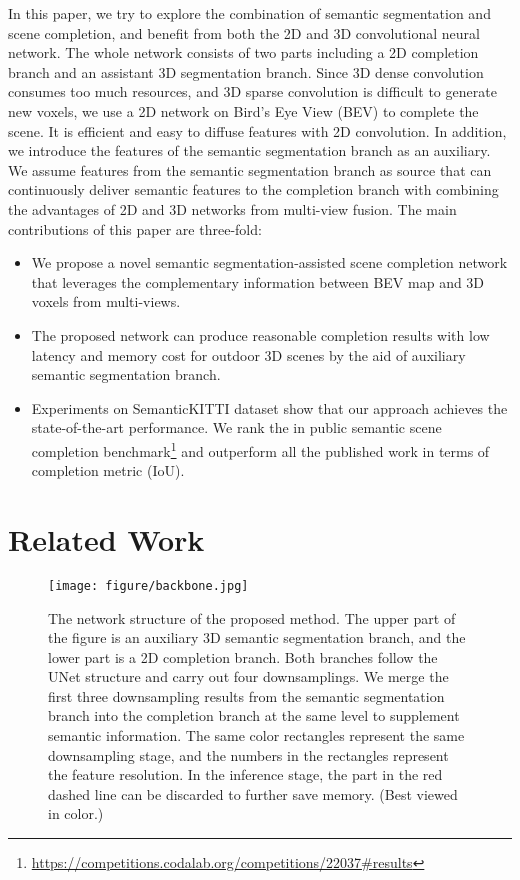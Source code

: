 \documentclass[letterpaper, 10 pt, conference]{ieeeconf}
\begin{document}
In this paper, we try to explore the combination of semantic segmentation and scene completion, and benefit from both the 2D and 3D convolutional neural network. The whole network consists of two parts including a 2D completion branch and an assistant 3D segmentation branch. Since 3D dense convolution consumes too much resources, and 3D sparse convolution is difficult to generate new voxels, we use a 2D network on Bird's Eye View (BEV) to complete the scene. It is efficient and easy to diffuse features with 2D convolution. In addition, we introduce the features of the semantic segmentation branch as an auxiliary. We assume features from the semantic segmentation branch as source that can continuously deliver semantic features to the completion branch with combining the advantages of 2D and 3D networks from multi-view fusion. The main contributions of this paper are three-fold:
\begin{itemize}
   \item We propose a novel semantic segmentation-assisted scene completion network that leverages the complementary information between BEV map and 3D voxels from multi-views.
   \item The proposed network can produce reasonable completion results with low latency and memory cost for outdoor 3D scenes by the aid of auxiliary semantic segmentation branch.
   \item Experiments on SemanticKITTI dataset show that our approach achieves the state-of-the-art performance. We rank the  in public semantic scene completion benchmark\footnote{\url{https://competitions.codalab.org/competitions/22037\#results}} and outperform all the published work in terms of completion metric (IoU).
   
\end{itemize}

\section{Related Work}

\begin{figure*}[t]
   \centering
   \texttt{[image: figure/backbone.jpg]}
   \caption{The network structure of the proposed method. The upper part of the figure is an auxiliary 3D semantic segmentation branch, and the lower part is a 2D completion branch. Both branches follow the UNet structure and carry out four downsamplings. We merge the first three downsampling results from the semantic segmentation branch into the completion branch at the same level to supplement semantic information. The same color rectangles represent the same downsampling stage, and the numbers in the rectangles represent the feature resolution. In the inference stage, the part in the red dashed line can be discarded to further save memory. (Best viewed in color.)}
   \label{fig:backbone}
   \vspace{-0.3cm}
\end{figure*}
\end{document}

